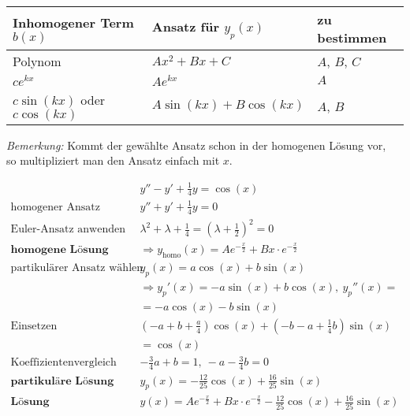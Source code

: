 \begin{table}[H]
	\centering
	\begin{tabular}{|l|l|l|}
		\hline
		\textbf{Inhomogener Term $b(x)$} & \textbf{Ansatz f{\"u}r $y_p(x)$}	& \textbf{zu bestimmen}		\\ \hline
		Polynom				& $Ax^2 + Bx + C$			& $A$, $B$, $C$		\\ \hline
		$c e^{k x}$ & $Ae^{kx}$					& $A$				\\ \hline
		$c\sin(kx)$ oder $c\cos(kx)$ & $A\sin(kx) + B\cos(kx)$ & $A$, $B$ \\ \hline
		
	\end{tabular}
\end{table}

\emph{Bemerkung:} Kommt der gew{\"a}hlte Ansatz schon in der homogenen L{\"o}sung vor,\\ so multipliziert man den Ansatz einfach mit $x$.

\begin{equation*}
\begin{split}
& y'' - y' + \frac{1}{4}y = \cos(x) \\
\text{homogener Ansatz}\quad & y'' + y' + \frac{1}{4}y = 0 \\
\text{Euler-Ansatz anwenden}\quad & \lambda^2 + \lambda + \frac{1}{4} = (\lambda + \frac{1}{2})^2 = 0 \\
\textbf{homogene L{\"o}sung}\quad &\Rightarrow y_\text{homo}(x) = Ae^{-\frac{x}{2}} + Bx \cdot e^{-\frac{x}{2}} \\
\text{partikul{\"a}rer Ansatz w{\"a}hlen}\quad & y_p(x) = a\cos(x) + b\sin(x) \\
& \Rightarrow y_p'(x) = -a\sin(x) + b\cos(x),\  y_p''(x) = \\ & = -a\cos(x) -b \sin(x) \\
\text{Einsetzen}\quad & (-a + b + \frac{a}{4})\cos(x) + (-b -a + \frac{1}{4}b)\sin(x) \\&= \cos(x) \\
\text{Koeffizientenvergleich}\quad & -\frac{3}{4}a + b = 1,\ -a-\frac{3}{4}b = 0 \\
\textbf{partikul{\"a}re L{\"o}sung}\quad & y_p(x) = -\frac{12}{25}\cos(x) + \frac{16}{25}\sin(x) \\
\textbf{L{\"o}sung}\quad & y(x) = Ae^{-\frac{x}{2}} + Bx \cdot e^{-\frac{x}{2}} -\frac{12}{25}\cos(x) + \frac{16}{25}\sin(x)
\end{split}
\end{equation*}
